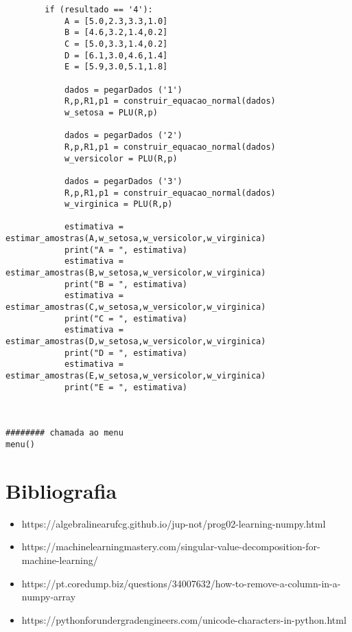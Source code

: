 \documentclass[a4paper,12pt,twoside]{article}
\begin{document}
\begin{lstlisting}
        if (resultado == '4'):
            A = [5.0,2.3,3.3,1.0]
            B = [4.6,3.2,1.4,0.2]
            C = [5.0,3.3,1.4,0.2]
            D = [6.1,3.0,4.6,1.4]
            E = [5.9,3.0,5.1,1.8]
            
            dados = pegarDados ('1')
            R,p,R1,p1 = construir_equacao_normal(dados)
            w_setosa = PLU(R,p)
            
            dados = pegarDados ('2')
            R,p,R1,p1 = construir_equacao_normal(dados)
            w_versicolor = PLU(R,p)
            
            dados = pegarDados ('3')
            R,p,R1,p1 = construir_equacao_normal(dados)
            w_virginica = PLU(R,p)
            
            estimativa = estimar_amostras(A,w_setosa,w_versicolor,w_virginica)
            print("A = ", estimativa)
            estimativa = estimar_amostras(B,w_setosa,w_versicolor,w_virginica)
            print("B = ", estimativa)
            estimativa = estimar_amostras(C,w_setosa,w_versicolor,w_virginica)
            print("C = ", estimativa)
            estimativa = estimar_amostras(D,w_setosa,w_versicolor,w_virginica)
            print("D = ", estimativa)
            estimativa = estimar_amostras(E,w_setosa,w_versicolor,w_virginica)
            print("E = ", estimativa)
            
    
    
######## chamada ao menu
menu()
\end{lstlisting}



\section{Bibliografia}
\begin{itemize}
   \item https://algebralinearufcg.github.io/jup-not/prog02-learning-numpy.html
   \item https://machinelearningmastery.com/singular-value-decomposition-for-machine-learning/
   \item https://pt.coredump.biz/questions/34007632/how-to-remove-a-column-in-a-numpy-array
   \item https://pythonforundergradengineers.com/unicode-characters-in-python.html
 \end{itemize}
\end{document}
